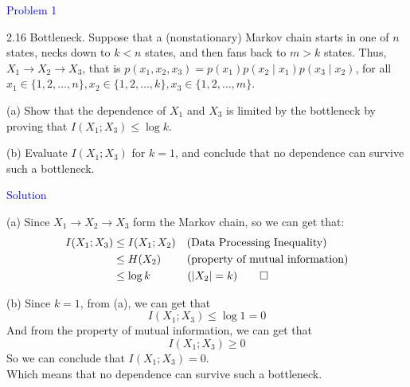 \textcolor{blue}{Problem 1}

2.16 Bottleneck. Suppose that a (nonstationary) Markov chain starts in one of $n$ states, necks down to $k<n$ states, and then fans back to $m>k$ states. Thus, $X_1 \rightarrow X_2 \rightarrow X_3$, that is $p\left(x_1, x_2, x_3\right)=p\left(x_1\right) p\left(x_2 \mid x_1\right) p\left(x_3 \mid x_2\right)$, for all $x_1 \in\{1,2, \ldots, n\}, x_2 \in\{1,2, \ldots, k\}, x_3 \in\{1,2, \ldots, m\}$.

(a) Show that the dependence of $X_1$ and $X_3$ is limited by the bottleneck by proving that $I\left(X_1 ; X_3\right) \leq \log k$.

(b) Evaluate $I\left(X_1 ; X_3\right)$ for $k=1$, and conclude that no dependence can survive such a bottleneck.

\textcolor{blue}{Solution}

(a) Since $X_1 \rightarrow X_2 \rightarrow X_3$ form the Markov chain, so we can get that:
\begin{align*}
I(X_1;X_3) &\leq I(X_1;X_2) \text{\ \ \ (Data Processing Inequality)} \\
&\leq H(X_2) \text{\ \ \ \ \ \ \ (property of mutual information)} \\
&\leq \log k \text{\ \ \ \ \ \ \ \ \ \ ($|X_2|=k$)} \qed
\end{align*}

(b) Since $k=1$, from (a), we can get that
$$I(X_1;X_3) \leq \log 1 = 0$$
And from the property of mutual information, we can get that
$$I(X_1;X_3) \geq 0$$
So we can conclude that $I(X_1;X_3) = 0$.\\
Which means that no dependence can survive such a bottleneck.

\newpage